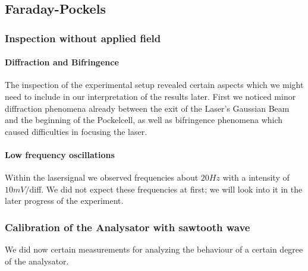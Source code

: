 \subsection{Faraday-Pockels}
\subsubsection{Inspection without applied field}
\paragraph{Diffraction and Bifringence}
The inspection of the experimental setup revealed certain aspects
which we might need to include in our interpretation of the results
later. First we noticed minor diffraction phenomena already between
the exit of the Laser's Gaussian Beam and the beginning of the
Pockelcell, as well as bifringence phenomena which caused difficulties
in focusing the laser.  
\paragraph{Low frequency oscillations} Within the lasersignal 
we observed frequencies about $20 Hz$ with a intensity of $10mV/$diff.
We did not expect these frequencies at first; we will look into it
in the later progress of the experiment.
\subsubsection{Calibration of the Analysator with sawtooth wave}
We did now certain measurements for analyzing the behaviour of a 
certain degree of the analysator.
\newcommand{\picwidth}{0.48\textwidth}

